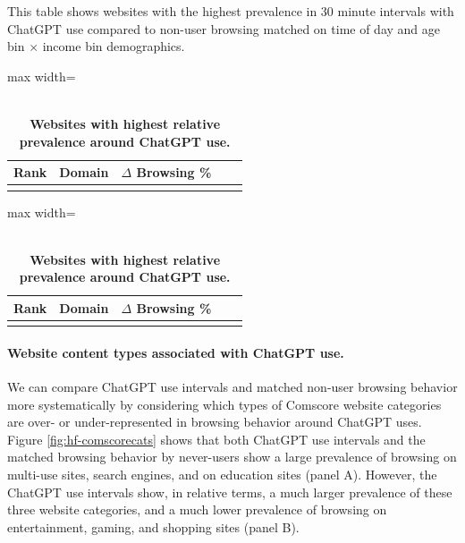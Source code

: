 \documentclass[12pt]{article}
\begin{document}
\begin{table}[htbp]
\caption{\\ \centering \textbf{Websites with highest relative prevalence around ChatGPT use.}}  

\vspace{-0.1cm} \label{tab:topsites-gptwindow} \footnotesize  This table shows websites with the {highest} prevalence in 30 minute intervals with ChatGPT use compared to non-user browsing matched on time of day and age bin $\times$ income bin demographics.

\vspace{0.2cm}

\centering
\begin{adjustbox}{max width=\textwidth}   
\begin{tabular}{@{}l*{4}{c}@{}}
\toprule
Rank & Domain & $\Delta$ Browsing \% \\
\midrule
      \addlinespace
                     
                   \bottomrule
                   \end{tabular}
\end{adjustbox}
\begin{adjustbox}{max width=\textwidth}
\begin{tabular}{@{}l*{4}{c}@{}}
\toprule
Rank & Domain & $\Delta$ Browsing \% \\
\midrule
      \addlinespace
                     
                   \bottomrule
                   \end{tabular}
\end{adjustbox}
\end{table}

\paragraph{Website content types associated with ChatGPT use.} We can compare ChatGPT use intervals and matched non-user browsing behavior more systematically by considering which types of Comscore website categories are over- or under-represented in browsing behavior around ChatGPT uses. Figure \ref{fig:hf-comscorecats} shows that both ChatGPT use intervals and the matched browsing behavior by never-users show a large prevalence of browsing on multi-use sites, search engines, and on education sites (panel A). However, the ChatGPT use intervals show, in relative terms, a much larger prevalence of these three website categories, and a much lower prevalence of browsing on entertainment, gaming, and shopping sites (panel B).
\end{document}
